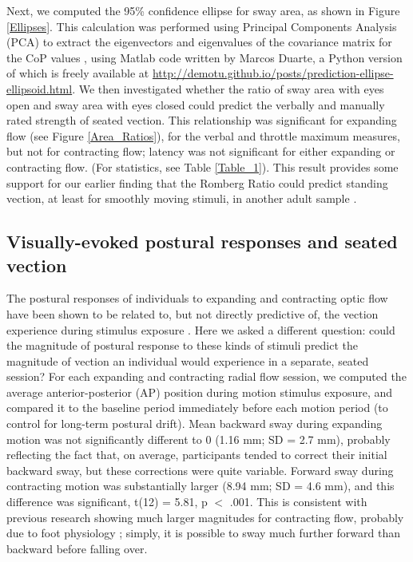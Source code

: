 \documentclass[11pt]{article}
\begin{document}
\begin{linenumbers}
Next, we computed the 95\% confidence ellipse for sway area, as shown in Figure \ref{Ellipses}. This calculation was performed using Principal Components Analysis (PCA) to extract the eigenvectors and eigenvalues of the covariance matrix for the CoP values \cite{Oliveira:1996uk}, using Matlab code written by Marcos Duarte, a Python version of which is freely available at \href{http://demotu.github.io/posts/prediction-ellipse-ellipsoid.html}{http://demotu.github.io/posts/prediction-ellipse-ellipsoid.html}. We then investigated whether the ratio of sway area with eyes open and sway area with eyes closed could predict the verbally and manually rated strength of seated vection. This relationship was significant for expanding flow (see Figure \ref{Area_Ratios}), for the verbal and throttle maximum measures, but not for contracting flow; latency was not significant for either expanding or contracting flow. (For statistics, see Table \ref{Table_1}). This result provides some support for our earlier finding that the Romberg Ratio could predict standing vection, at least for smoothly moving stimuli, in another adult sample \cite{Palmisano:2014ez}. 


\subsection*{Visually-evoked postural responses and seated vection}
The postural responses of individuals to expanding and contracting optic flow have been shown to be related to, but not directly predictive of, the vection experience during stimulus exposure \cite{Palmisano:2009uc,Tanahashi:2007hf, Guerraz:2008vo}. Here we asked a different question: could the magnitude of postural response to these kinds of stimuli predict the magnitude of vection an individual would experience in a separate, seated session? For each expanding and contracting radial flow session, we computed the average anterior-posterior (AP) position during motion stimulus exposure, and compared it to the baseline period immediately before each motion period (to control for long-term postural drift). Mean backward sway during expanding motion was not significantly different to 0 (1.16 mm; SD = 2.7 mm), probably reflecting the fact that, on average, participants tended to correct their initial backward sway, but these corrections were quite variable. Forward sway during contracting motion was substantially larger (8.94 mm; SD = 4.6 mm), and this difference was significant, t(12) = 5.81, p $<$ .001. This is consistent with previous research showing much larger magnitudes for contracting flow, probably due to foot physiology \cite{Palmisano:2009uc}; simply, it is possible to sway much further forward than backward before falling over. 



\end{linenumbers}
\end{document}
